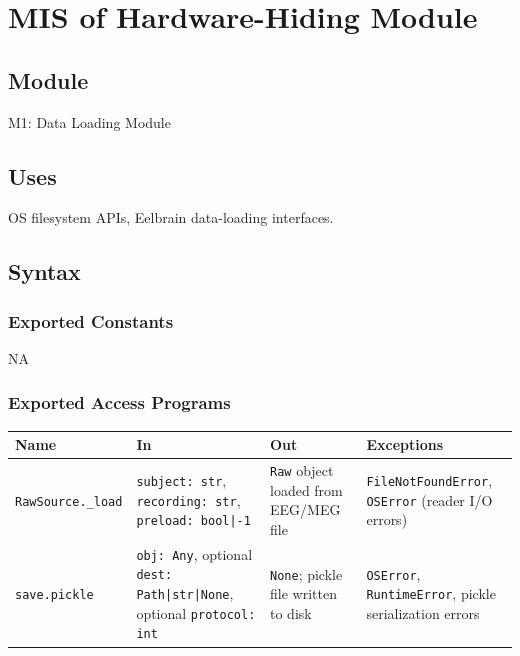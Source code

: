 \documentclass[12pt, titlepage]{article}
\begin{document}
\newpage

\section{MIS of Hardware-Hiding Module} \label{MIS:HH} 



\subsection{Module}

M1: Data Loading Module

\subsection{Uses}
OS filesystem APIs, Eelbrain data-loading interfaces.
\subsection{Syntax}

\subsubsection{Exported Constants}
NA

\subsubsection{Exported Access Programs}

\begin{center}
\begin{tabular}{p{3cm} p{4cm} p{4cm} p{3cm}}
\hline
\textbf{Name} & \textbf{In} & \textbf{Out} & \textbf{Exceptions} \\
\hline
\texttt{RawSource.\_load} & \texttt{subject: str}, \texttt{recording: str}, \texttt{preload: bool|-1} & \texttt{Raw} object loaded from EEG/MEG file & \texttt{FileNotFoundError}, \texttt{OSError} (reader I/O errors) \\
\texttt{save.pickle} & \texttt{obj: Any}, optional \texttt{dest: Path|str|None}, optional \texttt{protocol: int} & \texttt{None}; pickle file written to disk & \texttt{OSError}, \texttt{RuntimeError}, pickle serialization errors \\
\hline
\end{tabular}
\end{center}
\end{document}
